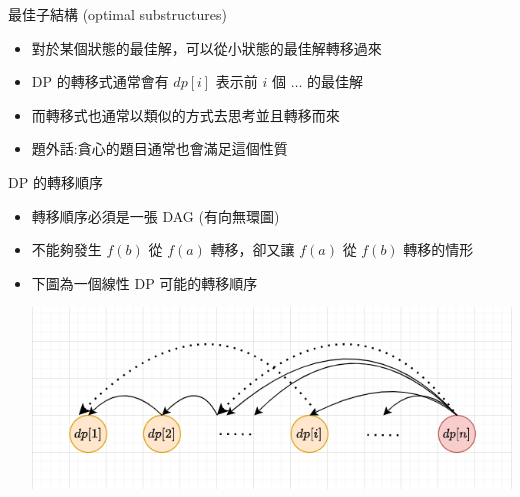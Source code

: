 \documentclass[aspectratio=169]{beamer}
\begin{document}
\begin{frame}{最佳子結構 (optimal substructures)}
    \begin{itemize}
        \item<1-> 對於某個狀態的最佳解，可以從小狀態的最佳解轉移過來
        \item<2-> DP 的轉移式通常會有 $dp[i]$ 表示前 $i$ 個 $\ldots$ 的最佳解 
        \item<2-> 而轉移式也通常以類似的方式去思考並且轉移而來
        \item<3-> 題外話:貪心的題目通常也會滿足這個性質
    \end{itemize}
\end{frame}

\begin{frame}{DP 的轉移順序}
    \begin{itemize}
        \item 轉移順序必須是一張 DAG (有向無環圖)
        \item 不能夠發生 $f(b)$ 從 $f(a)$ 轉移，卻又讓 $f(a)$ 從 $f(b)$ 轉移的情形
        \item 下圖為一個線性 DP 可能的轉移順序 
        \begin{center}
            \includegraphics[scale=0.75]{images/DP_DAG.png}
        \end{center}
    \end{itemize}
\end{frame}
\end{document}
